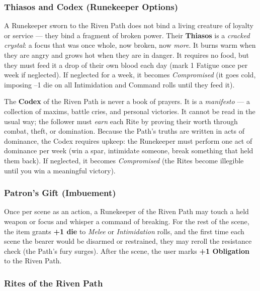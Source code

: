 \subsubsection*{Thiasos and Codex (Runekeeper Options)}

A Runekeeper sworn to the Riven Path does not bind a living creature of loyalty or service --- they bind a fragment of broken power. Their \textbf{Thiasos} is a \textit{cracked crystal}: a focus that was once whole, now broken, now \textit{more}. It burns warm when they are angry and grows hot when they are in danger. It requires no food, but they must feed it a drop of their own blood each day (mark 1 Fatigue once per week if neglected). If neglected for a week, it becomes \textit{Compromised} (it goes cold, imposing --1 die on all Intimidation and Command rolls until they feed it).

The \textbf{Codex} of the Riven Path is never a book of prayers. It is a \textit{manifesto} --- a collection of maxims, battle cries, and personal victories. It cannot be read in the usual way; the follower must \textit{earn} each Rite by proving their worth through combat, theft, or domination. Because the Path's truths are written in acts of dominance, the Codex requires upkeep: the Runekeeper must perform one act of dominance per week (win a spar, intimidate someone, break something that held them back). If neglected, it becomes \textit{Compromised} (the Rites become illegible until you win a meaningful victory).

\subsubsection*{Patron's Gift (Imbuement)}

Once per scene as an action, a Runekeeper of the Riven Path may touch a held weapon or focus and whisper a command of breaking. For the rest of the scene, the item grants \textbf{+1 die} to \textit{Melee} or \textit{Intimidation} rolls, and the first time each scene the bearer would be disarmed or restrained, they may reroll the resistance check (the Path's fury surges). After the scene, the user marks \textbf{+1 Obligation} to the Riven Path.

\subsubsection*{Rites of the Riven Path}

